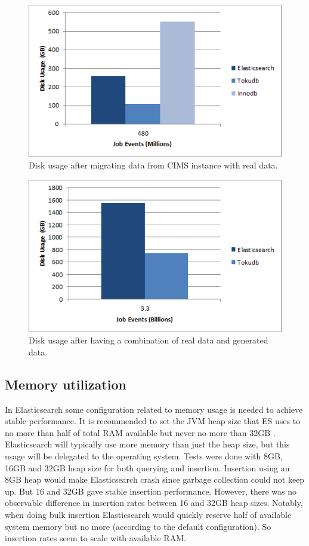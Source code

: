 \begin{figure}[h!]
\centering
\includegraphics[scale=0.78]{figure/disksmall.png}
\caption{Disk usage after migrating data from CIMS instance with real data.}
\label{fig:disc}
\end{figure}

\begin{figure}[h!]
\centering
\includegraphics[scale=0.78]{figure/diskbig.png}
\caption{Disk usage after having a combination of real data and generated data.}
\label{fig:discbig}
\end{figure}

\subsection{Memory utilization}

In Elasticsearch some configuration related to memory usage is needed to achieve stable performance. It is recommended to set the JVM heap size that ES uses to no more than half of total RAM available but never no more than 32GB \cite{JVM, ESmemory}. Elasticsearch will typically use more memory than just the heap size, but this usage will be delegated to the operating system. Tests were done with 8GB, 16GB and 32GB heap size for both querying and insertion. Insertion using an 8GB heap would make Elasticsearch crash since garbage collection could not keep up. But 16 and 32GB gave stable insertion performance. However, there was no observable difference in insertion rates between 16 and 32GB heap sizes. Notably, when doing bulk insertion Elasticsearch would quickly reserve half of available system memory but no more (according to the default configuration). So insertion rates seem to scale with available RAM.

